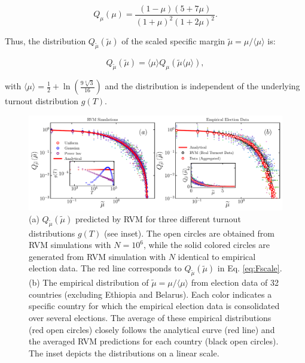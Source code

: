 \begin{equation}
    Q_{\mu}(\mu) = \frac{(1 - \mu)(5 + 7\mu)}{(1 + \mu)^2(1 + 2\mu)^2}.
\end{equation}

Thus, the distribution $Q_{\widetilde{\mu}}\left(\widetilde{\mu}\right)$ of the scaled specific margin $\widetilde{\mu} = \mu/\langle\mu\rangle$ is:

\begin{equation}
    Q_{\widetilde{\mu}}\left(\widetilde{\mu}\right) = \langle\mu\rangle Q_{\mu}\left(\widetilde{\mu}\langle\mu\rangle\right),
    \label{eq:Fscale}
\end{equation}

with $\langle\mu\rangle = \frac{1}{2} + \ln\left(\frac{9\sqrt[4]{3}}{16}\right)$ and the distribution is independent of the underlying turnout distribution $g(T)$.

\begin{figure}[H]
    \centering
    \includegraphics[width=\textwidth]{chapters/chapter4/universality_simulation_empirical_analytical.pdf}
    \caption{(a) $Q_{\widetilde{\mu}}\left(\widetilde{\mu}\right)$ predicted by RVM for three different turnout distributions $g(T)$ (see inset). The open circles are obtained from RVM simulations with $N = 10^6$, while the solid colored circles are generated from RVM simulation with $N$ identical to empirical election data. The red line corresponds to $Q_{\widetilde{\mu}}\left(\widetilde{\mu}\right)$ in Eq. \ref{eq:Fscale}. (b) The empirical distribution of $\widetilde{\mu} = \mu/\langle \mu \rangle$ from election data of 32 countries (excluding Ethiopia and Belarus). Each color indicates a specific country for which the empirical election data is consolidated over several elections. The average of these empirical distributions (red open circles) closely follows the analytical curve (red line) and the averaged RVM predictions for each country (black open circles). The inset depicts the distributions on a linear scale.}
    \label{fig:universality}
\end{figure}


